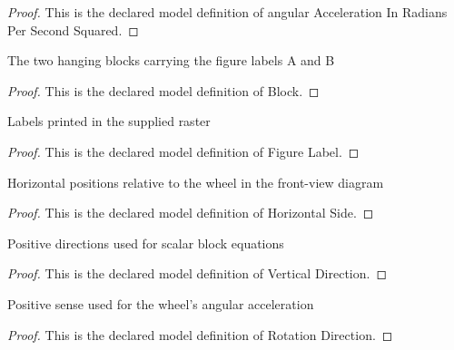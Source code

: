 \begin{proof}
  This is the declared model definition of angular Acceleration In Radians Per Second Squared.
\end{proof}
\begin{definition}[Block]
  \label{def:physics:phyx-mini-0783:phyxminiproblems-problemphyxmini0783-block}
  The two hanging blocks carrying the figure labels A and B
\end{definition}
\begin{proof}
  This is the declared model definition of Block.
\end{proof}
\begin{definition}
  \label{def:physics:phyx-mini-0783:phyxminiproblems-problemphyxmini0783-figurelabel}
  Labels printed in the supplied raster
\end{definition}
\begin{proof}
  This is the declared model definition of Figure Label.
\end{proof}
\begin{definition}
  \label{def:physics:phyx-mini-0783:phyxminiproblems-problemphyxmini0783-horizontalside}
  Horizontal positions relative to the wheel in the front-view diagram
\end{definition}
\begin{proof}
  This is the declared model definition of Horizontal Side.
\end{proof}
\begin{definition}
  \label{def:physics:phyx-mini-0783:phyxminiproblems-problemphyxmini0783-verticaldirection}
  Positive directions used for scalar block equations
\end{definition}
\begin{proof}
  This is the declared model definition of Vertical Direction.
\end{proof}
\begin{definition}
  \label{def:physics:phyx-mini-0783:phyxminiproblems-problemphyxmini0783-rotationdirection}
  Positive sense used for the wheel's angular acceleration
\end{definition}
\begin{proof}
  This is the declared model definition of Rotation Direction.
\end{proof}
